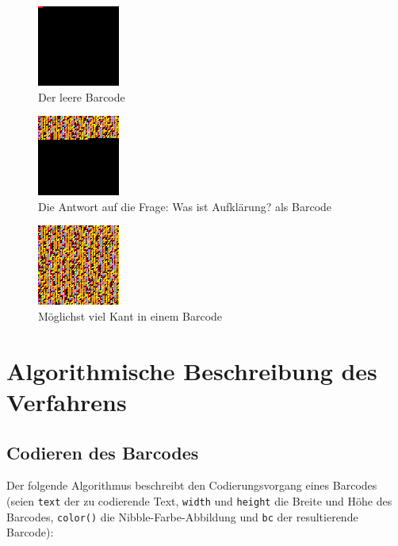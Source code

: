 \documentclass[11pt]{scrreprt} %
\theoremstyle{definition}
\begin{document}
\begin{enumerate}
\begin{figure}
\caption{Der leere Barcode}
\label{test:leer}
\begin{center}
\includegraphics[scale=1.4]{../leer.png}
\end{center}
\end{figure}
\begin{figure}
\caption{Die Antwort auf die Frage: Was ist Aufklärung? als Barcode}
\label{fig:onebyte}
\begin{center}
\includegraphics[scale=1.4]{../kant.png}
\end{center}
\end{figure}
\begin{figure}
\caption{Möglichst viel Kant in einem Barcode}
\label{fig:onebyte}
\begin{center}
\includegraphics[scale=1.4]{../kantkant.png}
\end{center}
\end{figure}


\end{enumerate}

\chapter{Algorithmische Beschreibung des Verfahrens}

\section{Codieren des Barcodes}

Der folgende Algorithmus beschreibt den Codierungsvorgang eines Barcodes (seien {\tt text} der zu codierende Text, {\tt width} und {\tt height} die Breite und Höhe des Barcodes, {\tt color()} die Nibble-Farbe-Abbildung und {\tt bc} der resultierende Barcode):
\end{document}
